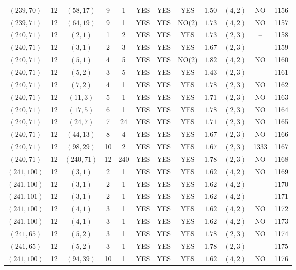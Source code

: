 \begin{longtable}{|c|c|c|c|c|c|c|c|c|c|c|c|}
$(239,70)$ & 12 & $(58,17)$ & 9 & 1 & YES & YES & YES & $1.50$ & $(4,2)$ & NO & 1156\\
$(239,71)$ & 12 & $(64,19)$ & 9 & 1 & YES & YES & NO(2) & $1.73$ & $(4,2)$ & NO & 1157\\
$(240,71)$ & 12 & $(2,1)$ & 1 & 2 & YES & YES & YES & $1.73$ & $(2,3)$ & -- & 1158\\
$(240,71)$ & 12 & $(3,1)$ & 2 & 3 & YES & YES & YES & $1.67$ & $(2,3)$ & -- & 1159\\
$(240,71)$ & 12 & $(5,1)$ & 4 & 5 & YES & YES & NO(2) & $1.82$ & $(4,2)$ & NO & 1160\\
$(240,71)$ & 12 & $(5,2)$ & 3 & 5 & YES & YES & YES & $1.43$ & $(2,3)$ & -- & 1161\\
$(240,71)$ & 12 & $(7,2)$ & 4 & 1 & YES & YES & YES & $1.78$ & $(2,3)$ & NO & 1162\\
$(240,71)$ & 12 & $(11,3)$ & 5 & 1 & YES & YES & YES & $1.71$ & $(2,3)$ & NO & 1163\\
$(240,71)$ & 12 & $(17,5)$ & 6 & 1 & YES & YES & YES & $1.78$ & $(2,3)$ & NO & 1164\\
$(240,71)$ & 12 & $(24,7)$ & 7 & 24 & YES & YES & YES & $1.71$ & $(2,3)$ & NO & 1165\\
$(240,71)$ & 12 & $(44,13)$ & 8 & 4 & YES & YES & YES & $1.67$ & $(2,3)$ & NO & 1166\\
$(240,71)$ & 12 & $(98,29)$ & 10 & 2 & YES & YES & YES & $1.67$ & $(2,3)$ & 1333 & 1167\\
$(240,71)$ & 12 & $(240,71)$ & 12 & 240 & YES & YES & YES & $1.78$ & $(2,3)$ & NO & 1168\\
$(241,100)$ & 12 & $(3,1)$ & 2 & 1 & YES & YES & YES & $1.62$ & $(4,2)$ & NO & 1169\\
$(241,100)$ & 12 & $(3,1)$ & 2 & 1 & YES & YES & YES & $1.62$ & $(4,2)$ & -- & 1170\\
$(241,101)$ & 12 & $(3,1)$ & 2 & 1 & YES & YES & YES & $1.62$ & $(4,2)$ & -- & 1171\\
$(241,100)$ & 12 & $(4,1)$ & 3 & 1 & YES & YES & YES & $1.62$ & $(4,2)$ & NO & 1172\\
$(241,100)$ & 12 & $(4,1)$ & 3 & 1 & YES & YES & YES & $1.62$ & $(4,2)$ & NO & 1173\\
$(241,65)$ & 12 & $(5,2)$ & 3 & 1 & YES & YES & YES & $1.78$ & $(2,3)$ & NO & 1174\\
$(241,65)$ & 12 & $(5,2)$ & 3 & 1 & YES & YES & YES & $1.78$ & $(2,3)$ & -- & 1175\\
$(241,100)$ & 12 & $(94,39)$ & 10 & 1 & YES & YES & YES & $1.62$ & $(4,2)$ & NO & 1176\\

\end{longtable}
